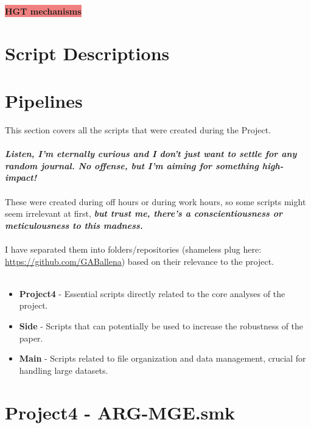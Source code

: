 \documentclass[11pt]{article}
\newcommand{\highlightrobust}[1]{\colorbox{lightcoral}{#1}}  %
\begin{document}
\par\noindent\highlightrobust{{\textbf{\large HGT mechanisms}}}
\onecolumn
\newpage
\setcounter{section}{1}  %



\newpage
\onecolumn

\section*{\centering \huge \textbf{Script Descriptions}}  %

\section*{Pipelines}  %
This section covers all the scripts that were created during the Project.
\\
\\
\textit{\textbf{Listen, I’m eternally curious and I don't just want to settle for any random journal. No offense, but I’m aiming for something high-impact!}} 
\\
\\
These were created during off hours or during work hours, so some scripts might seem irrelevant at first, \textbf{\textit{but trust me, there's a conscientiousness or meticulousness to this madness.}}
\\
\\
I have separated them into folders/repositories (shameless plug here: \href{https://github.com/GABallena}{https://github.com/GABallena}) based on their relevance to the project.
\\
\\
\begin{itemize}
	\item \textbf{Project4} - Essential scripts directly related to the core analyses of the project.
	\item \textbf{Side} - Scripts that can potentially be used to increase the robustness of the paper.
	\item \textbf{Main} - Scripts related to file organization and data management, crucial for handling large datasets.
\end{itemize}



\newpage
\setcounter{section}{1}
\setcounter{subsection}{0}
\section*{Project4 - ARG-MGE.smk}
\end{document}

